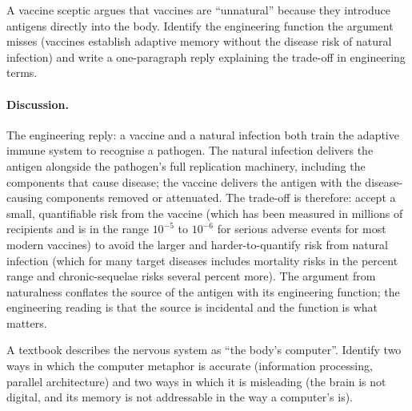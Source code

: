 \begin{exercise}
A vaccine sceptic argues that vaccines are ``unnatural'' because they
introduce antigens directly into the body. Identify the engineering
function the argument misses (vaccines establish adaptive memory
without the disease risk of natural infection) and write a
one-paragraph reply explaining the trade-off in engineering terms.
\end{exercise}

\paragraph{Discussion.}
The engineering reply: a vaccine and a natural infection both train
the adaptive immune system to recognise a pathogen. The natural
infection delivers the antigen alongside the pathogen's full
replication machinery, including the components that cause disease;
the vaccine delivers the antigen with the disease-causing components
removed or attenuated. The trade-off is therefore: accept a small,
quantifiable risk from the vaccine (which has been measured in
millions of recipients and is in the range $10^{-5}$ to $10^{-6}$ for
serious adverse events for most modern vaccines) to avoid the larger
and harder-to-quantify risk from natural infection (which for many
target diseases includes mortality risks in the percent range and
chronic-sequelae risks several percent more). The argument from
naturalness conflates the source of the antigen with its
engineering function; the engineering reading is that the source is
incidental and the function is what matters.

\begin{exercise}
A textbook describes the nervous system as ``the body's computer''.
Identify two ways in which the computer metaphor is accurate
(information processing, parallel architecture) and two ways in
which it is misleading (the brain is not digital, and its memory is
not addressable in the way a computer's is).
\end{exercise}

